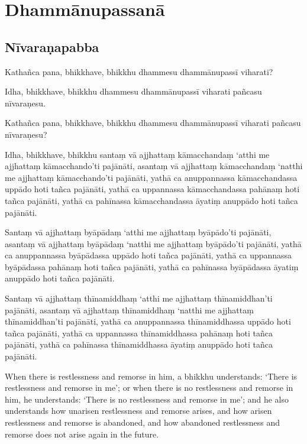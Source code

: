 \paliPage
\chapter*{Dhammānupassanā}

\section*{Nīvaraṇapabba}

Kathañca pana, bhikkhave, bhikkhu dhammesu dhammānupassī viharati?

Idha, bhikkhave, bhikkhu dhammesu dhammānupassī viharati pañcasu nīvaraṇesu.

Kathañca pana, bhikkhave, bhikkhu dhammesu dhammānupassī viharati pañcasu
nīvaraṇesu?

Idha, bhikkhave, bhikkhu
santaṃ vā ajjhattaṃ kāmacchandaṃ ‘atthi me ajjhattaṃ kāmacchando’ti pajānāti,
asantaṃ vā ajjhattaṃ kāmacchandaṃ ‘natthi me ajjhattaṃ kāmacchando’ti pajānāti,
yathā ca anuppannassa kāmacchandassa uppādo hoti tañca pajānāti,
yathā ca uppannassa kāmacchandassa pahānaṃ hoti tañca pajānāti,
yathā ca pahīnassa kāmacchandassa āyatiṃ anuppādo hoti tañca pajānāti.

Santaṃ vā ajjhattaṃ byāpādaṃ ‘atthi me ajjhattaṃ byāpādo’ti pajānāti,
asantaṃ vā ajjhattaṃ byāpādaṃ ‘natthi me ajjhattaṃ byāpādo’ti pajānāti,
yathā ca anuppannassa byāpādassa uppādo hoti tañca pajānāti,
yathā ca uppannassa byāpādassa pahānaṃ hoti tañca pajānāti,
yathā ca pahīnassa byāpādassa āyatiṃ anuppādo hoti tañca pajānāti.

\enlargethispage{\baselineskip}

Santaṃ vā ajjhattaṃ thīnamiddhaṃ ‘atthi me ajjhattaṃ thīnamiddhan’ti pajānāti,
asantaṃ vā ajjhattaṃ thīnamiddhaṃ ‘natthi me ajjhattaṃ thīnamiddhan’ti pajānāti,
yathā ca anuppannassa thīnamiddhassa uppādo hoti tañca pajānāti,
yathā ca uppannassa thīnamiddhassa pahānaṃ hoti tañca pajānāti,
yathā ca pahīnassa thīnamiddhassa āyatiṃ anuppādo hoti tañca pajānāti.

\englishPage

When there is restlessness and remorse in him, a bhikkhu understands:
`There is restlessness and remorse in me';
or when there is no restlessness and remorse in him, he understands:
`There is no restlessness and remorse in me';
and he also understands how unarisen restlessness and remorse arises,
and how arisen restlessness and remorse is abandoned,
and how abandoned restlessness and remorse does not arise again in the future.

